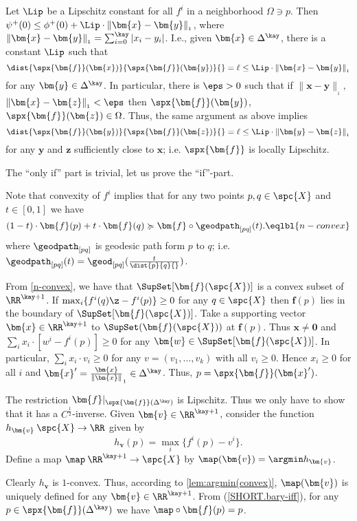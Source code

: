 Let $\Lip$ be a Lipschitz constant for all $f^i$ in a neighborhood $\Omega\ni p$.
Then $\psi^+(0)\le \phi^+(0)+\Lip\cdot\|\bm{x}-\bm{y}\|_{{}_1}$, 
where $\|\bm{x}-\bm{y}\|_{{}_1}=\sum_{i=0}^\kay|x_i-y_i|$.
I.e., given $\bm{x}\in\Delta^\kay$, there is a constant $\Lip$ such that
$$\dist{\spx{\bm{f}}(\bm{x})}{\spx{\bm{f}}(\bm{y})}{}=\ell\le \Lip\cdot\|\bm{x}-\bm{y}\|_{{}_1}$$
for any $\bm{y}\in\Delta^\kay$.
In particular, there is $\eps>0$ such that if $\|\bm{x}-\bm{y}\|_{{}_1},$ $\|\bm{x}-\bm{z}\|_{{}_1} <\eps$ then $\spx{\bm{f}}(\bm{y})$, $\spx{\bm{f}}(\bm{z})\in\Omega$. 
Thus, the same argument as above implies 
$$\dist{\spx{\bm{f}}(\bm{y})}{\spx{\bm{f}}(\bm{z})}{}
=
\ell\le \Lip\cdot\|\bm{y}-\bm{z}\|_{{}_1}$$
for any $\bm{y}$ and $\bm{z}$ sufficiently close to $\bm{x}$;
i.e. $\spx{\bm{f}}$ is locally Lipschitz.

 The ``only if'' part is trivial, let us prove  the ``if''-part.

Note that convexity of $f^i$ implies that
for any two points $p,q\in \spc{X}$ and $t\in[0,1]$ we have
$$(1-t)\cdot\bm{f}(p)+t\cdot \bm{f}(q)
\succcurlyeq
\bm{f}\circ\geodpath_{[p q]}(t).
\eqlbl{n-convex}$$
where $\geodpath_{[p q]}$ is geodesic path form $p$ to $q$; 
i.e. $\geodpath_{[p q]}(t)=\geod_{[p q]}(\tfrac{t}{\dist{p}{q}{}})$. 

From \ref{n-convex}, we have that $\SupSet[\bm{f}(\spc{X})]$ is a convex subset of $\RR^{\kay+1}$.
If $\max_{i}\{f^i(q)\z-f^i(p)\}\ge0$ for any $q\in \spc{X}$ then $\bm{f}(p)$ lies in the boundary of $\SupSet[\bm{f}(\spc{X})]$.
Take a supporting vector $\bm{x}\in\RR^{\kay+1}$ to $\SupSet(\bm{f}(\spc{X}))$ at $\bm{f}(p)$.
Thus $\bm{x}\not=\bm{0}$ and $\sum_i x_i\cdot[w^i-f^i(p)]\ge0$ for any 
$\bm{w}\in \SupSet[\bm{f}(\spc{X})]$. In particular, $\sum_i x_i\cdot v_i \ge 0$ for any $v=(v_1,\ldots, v_k)$ with all $v_i\ge 0$.  Hence $x_i\ge 0$ for all $i$ and 
$\bm{x}'=\frac{\bm{x}}{\|\bm{x}\|}_{{}_1}\in\Delta^\kay$. 
Thus, $p=\spx{\bm{f}}(\bm{x}')$. 

The restriction $\bm{f}|_{\spx{\bm{f}}(\Delta^\kay)}$ is Lipschitz.
Thus we only have to show that it has a  $C^{\frac{1}{2}}$-inverse.
Given $\bm{v}\in\RR^{\kay+1}$, consider the function 
$h_{\bm{v}}\: \spc{X}\to \RR$ given by
$$h_{\bm{v}}(p)=\max_{i}\{f^i(p)-v^i\}.$$
Define a map $\map \:\RR^{\kay+1}\to \spc{X}$ by
$\map (\bm{v})=\argmin h_{\bm{v}}$.

Clearly $h_{\bm{v}}$ is $1$-convex.
Thus, according to \ref{lem:argmin(convex)}, $\map (\bm{v})$ is uniquely defined for any $\bm{v}\in\RR^{\kay+1}$.
From (\ref{SHORT.bary-iff}), for any $p\in \spx{\bm{f}}(\Delta^\kay)$ we have
$\map \circ\bm{f}(p)=p$.

